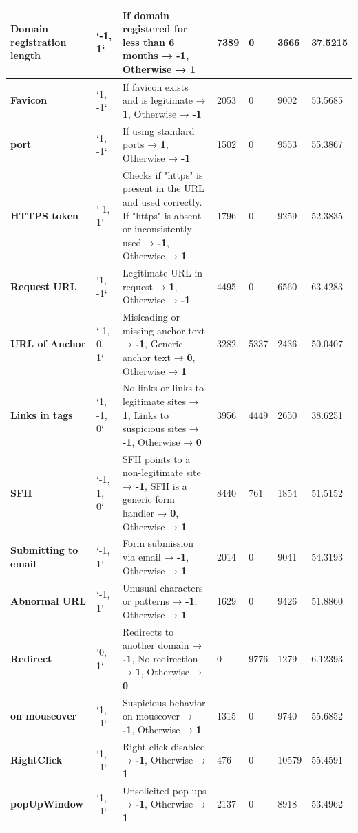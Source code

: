 \documentclass{sigkddExp}
\begin{document}
\begin{table}[h!]
\begin{tabular}{|p{3cm}|l|p{8cm}|l|l|l|l|}
\hline
\textbf{Domain registration length} & `-1, 1` & If domain registered for less than 6 months → \textbf{-1}, Otherwise → \textbf{1} & 7389 & 0 & 3666 & 37.5215 \\
\hline
\textbf{Favicon} & `1, -1` & If favicon exists and is legitimate → \textbf{1}, Otherwise → \textbf{-1} & 2053 & 0 & 9002 & 53.5685 \\
\hline
\textbf{port} & `1, -1` & If using standard ports → \textbf{1}, Otherwise → \textbf{-1} & 1502 & 0 & 9553 & 55.3867 \\
\hline
\textbf{HTTPS token} & `-1, 1` & Checks if "https" is present in the URL and used correctly. If "https" is absent or inconsistently used → \textbf{-1}, Otherwise → \textbf{1} & 1796 & 0 & 9259 & 52.3835 \\
\hline
\textbf{Request URL} & `1, -1` & Legitimate URL in request → \textbf{1}, Otherwise → \textbf{-1} & 4495 & 0 & 6560 & 63.4283 \\
\hline
\textbf{URL of Anchor} & `-1, 0, 1` & Misleading or missing anchor text → \textbf{-1}, Generic anchor text → \textbf{0}, Otherwise → \textbf{1} & 3282 & 5337 & 2436 & 50.0407 \\
\hline
\textbf{Links in tags} & `1, -1, 0` & No links or links to legitimate sites → \textbf{1}, Links to suspicious sites → \textbf{-1}, Otherwise → \textbf{0} & 3956 & 4449 & 2650 & 38.6251 \\
\hline
\textbf{SFH} & `-1, 1, 0` & SFH points to a non-legitimate site → \textbf{-1}, SFH is a generic form handler → \textbf{0}, Otherwise → \textbf{1} & 8440 & 761 & 1854 & 51.5152 \\
\hline
\textbf{Submitting to email} & `-1, 1` & Form submission via email → \textbf{-1}, Otherwise → \textbf{1} & 2014 & 0 & 9041 & 54.3193 \\
\hline
\textbf{Abnormal URL} & `-1, 1` & Unusual characters or patterns → \textbf{-1}, Otherwise → \textbf{1} & 1629 & 0 & 9426 & 51.8860 \\
\hline
\textbf{Redirect} & `0, 1` & Redirects to another domain → \textbf{-1}, No redirection → \textbf{1}, Otherwise → \textbf{0} & 0 & 9776 & 1279 & 6.12393 \\
\hline
\textbf{on mouseover} & `1, -1` & Suspicious behavior on mouseover → \textbf{-1}, Otherwise → \textbf{1} & 1315 & 0 & 9740 & 55.6852 \\
\hline
\textbf{RightClick} & `1, -1` & Right-click disabled → \textbf{-1}, Otherwise → \textbf{1} & 476 & 0 & 10579 & 55.4591 \\
\hline
\textbf{popUpWindow} & `1, -1` & Unsolicited pop-ups → \textbf{-1}, Otherwise → \textbf{1} & 2137 & 0 & 8918 & 53.4962 \\

\end{tabular}
\end{table}
\end{document}
